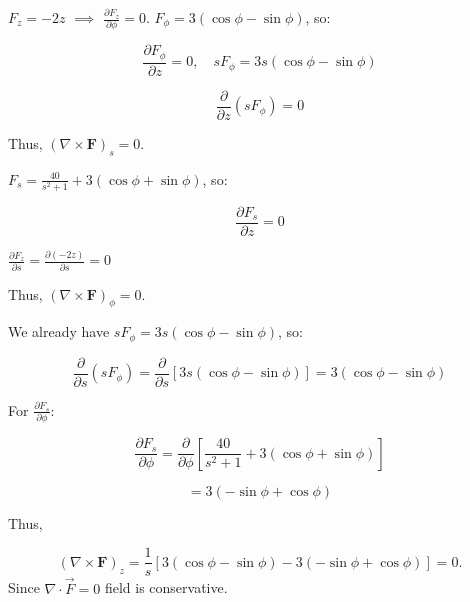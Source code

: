 \begin{problem}{}{}
\begin{enumerate}[(a)]
 \( F_z = -2z \) $\implies$ \( \frac{\partial F_z}{\partial \phi} = 0 \).
 \( F_\phi = 3(\cos\phi - \sin\phi) \), so:

  \[
  \frac{\partial F_\phi}{\partial z} = 0, \quad s F_\phi = 3s(\cos\phi - \sin\phi)
  \]

  \[
  \frac{\partial}{\partial z} (s F_\phi) = 0
  \]

Thus, \((\nabla \times \mathbf{F})_s = 0\).


 \( F_s = \frac{40}{s^2+1} + 3(\cos\phi + \sin\phi) \), so:

  \[
  \frac{\partial F_s}{\partial z} = 0
  \]

 \( \frac{\partial F_z}{\partial s} = \frac{\partial (-2z)}{\partial s} = 0 \)

Thus, \((\nabla \times \mathbf{F})_\phi = 0\).


 We already have \( s F_\phi = 3s(\cos\phi - \sin\phi) \), so:

  \[
  \frac{\partial}{\partial s} (s F_\phi) = \frac{\partial}{\partial s} [3s(\cos\phi - \sin\phi)] = 3(\cos\phi - \sin\phi)
  \]

 For \( \frac{\partial F_s}{\partial \phi} \):

  \[
  \frac{\partial F_s}{\partial \phi} = \frac{\partial}{\partial \phi} \left[ \frac{40}{s^2+1} + 3(\cos\phi + \sin\phi) \right]
  \]

  \[
  = 3(-\sin\phi + \cos\phi)
  \]

Thus,

\[
(\nabla \times \mathbf{F})_z = \frac{1}{s} \left[ 3(\cos\phi - \sin\phi) - 3(-\sin\phi + \cos\phi) \right] = 0.
\]
Since $\mathbb{\nabla}\cdot\vec{F} = 0$ field is conservative.
    \end{enumerate}
\end{problem}

\begin{problem}{}{}
    
\end{problem}


